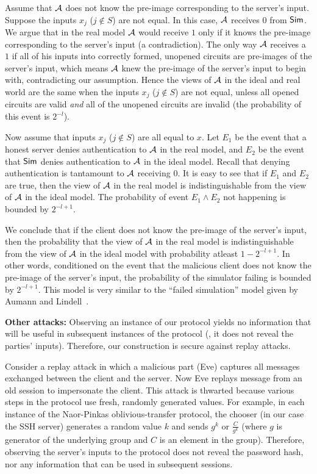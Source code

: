 Assume that ${\cal A}$ does not know the pre-image corresponding to
the server's input.  Suppose the inputs  $x_j$ ($j \not\in S$) are not
equal. In this case, ${\cal A}$ receives $0$ from ${\sf Sim}$. We argue
that in the real model ${\cal A}$ would receive $1$ only if it knows
the pre-image corresponding to the server's input (a contradiction).
The only way ${\cal A}$ receives a $1$ if all of his inputs into correctly
formed, unopened circuits are pre-images of the server's input, which
means ${\cal A}$ knew the pre-image of the server's input to begin with,
contradicting our assumption.  Hence the views of ${\cal A}$ in the
ideal and real world are the same when the inputs $x_j$ ($j \not\in S$)
are not equal, unless all opened circuits are valid \emph{and} all of the
unopened circuits are invalid (the probability of this event is $2^{-l}$).

Now assume that inputs $x_j$ ($j \not\in S$) are all equal to $x$.
Let $E_1$ be the event that a honest server denies authentication to
${\cal A}$ in the real model, and $E_2$ be the event that ${\sf Sim}$
denies authentication to ${\cal A}$ in the ideal model. Recall that
denying authentication is tantamount to ${\cal A}$ receiving $0$. It is
easy to see that if $E_1$ and $E_2$ are true, then the view of ${\cal A}$
in the real model is indistinguishable from the view of ${\cal A}$ in
the ideal model. The probability of event $E_1 \wedge E_2$ not happening
is bounded by $2^{-l+1}$.

We conclude that if the client does not know the pre-image of the server's
input, then the probability that the view of ${\cal A}$ in the real model
is indistinguishable from the view of ${\cal A}$ in the ideal model
with probability atleast $1-2^{-l+1}$.  In other words, conditioned
on the event that the malicious client does not know the pre-image of
the server's input, the probability of the simulator failing is bounded
by $2^{-l+1}$.  This model is very similar to the ``failed simulation''
model given by Aumann and Lindell~\cite[Section 3.2]{aumannlindell}.

\vspace{1ex}
\noindent
\textbf{Other attacks:}
Observing an instance of our protocol yields no information that will be
useful in subsequent instances of the protocol (\eg, it does not reveal
the parties' inputs).  Therefore, our construction is secure against
replay attacks.

Consider a replay attack in which a malicious part (Eve) captures all
messages exchanged between the client and the server.  Now Eve replays
message from an old session to impersonate the client. This attack is
thwarted because various steps in the protocol use fresh, randomly
generated values.  For example, in each instance of the Naor-Pinkas
oblivious-transfer protocol, the chooser (in our case the SSH server)
generates a random value $k$ and sends $g^k$ or $\frac{C}{g^k}$ (where $g$
is generator of the underlying group and $C$ is an element in the group).
Therefore, observing the server's inputs to the protocol does not reveal
the password hash, nor any information that can be used in subsequent
sessions.

